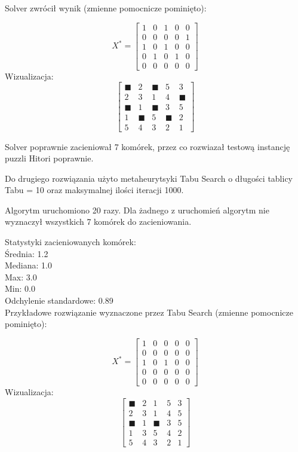 \documentclass{article}
\begin{document}
Solver zwrócił wynik (zmienne pomocnicze pominięto):

$$ X^{*} = \begin{bmatrix}
1 & 0 & 1 & 0 & 0 \\
0 & 0 & 0 & 0 & 1 \\
1 & 0 & 1 & 0 & 0 \\
0 & 1 & 0 & 1 & 0 \\
0 & 0 & 0 & 0 & 0 
\end{bmatrix}  $$
Wizualizacja:
$$ \begin{bmatrix}
\blacksquare & 2 & \blacksquare & 5 & 3 \\
2 & 3 & 1 & 4 & \blacksquare \\
\blacksquare & 1 & \blacksquare & 3 & 5 \\
1 & \blacksquare & 5 & \blacksquare & 2 \\
5 & 4 & 3 & 2 & 1 
\end{bmatrix}  $$

Solver poprawnie zacieniował 7 komórek, przez co rozwiazał testową instancję puzzli Hitori poprawnie.

Do drugiego rozwiązania użyto metaheurytsyki Tabu Search o długości tablicy Tabu = 10 oraz maksymalnej ilości iteracji 1000.

Algorytm uruchomiono 20 razy. Dla żadnego z uruchomień algorytm nie wyznaczył wszystkich 7 komórek do zacieniowania.

Statystyki zacieniowanych komórek: \\
Średnia: 1.2 \\
Mediana: 1.0 \\
Max: 3.0 \\
Min: 0.0 \\
Odchylenie standardowe: 0.89 \\

Przykładowe rozwiązanie wyznaczone przez Tabu Search  (zmienne pomocnicze pominięto):

$$ X^{*} = \begin{bmatrix}
1 & 0 & 0 & 0 & 0 \\
0 & 0 & 0 & 0 & 0 \\
1 & 0 & 1 & 0 & 0 \\
0 & 0 & 0 & 0 & 0 \\
0 & 0 & 0 & 0 & 0 
\end{bmatrix}  $$
Wizualizacja:
$$ \begin{bmatrix}
\blacksquare & 2 & 1 & 5 & 3 \\
2 & 3 & 1 & 4 & 5 \\
\blacksquare & 1 & \blacksquare & 3 & 5 \\
1 & 3 & 5 & 4 & 2 \\
5 & 4 & 3 & 2 & 1 
\end{bmatrix}  $$
\end{document}
